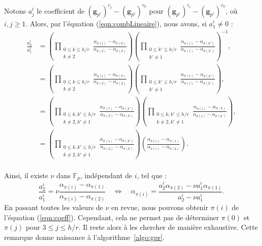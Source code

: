\documentclass[a4paper, titlepage, 11pt]{article}
\theoremstyle{definition}
\theoremstyle{remark}
\def\gf #1{\mathbb{F}_{#1}}
\def\mbf #1{\mathbf{#1}}
\begin{document}
Notons $a_j^i$ le coefficient de $(\mbf g_{p^r})^{c_{{j}}} - (\mbf g_{p^r})^{c_{0}}$ pour $(\mbf g_{p^r})^{c_{i}} - (\mbf g_{p^r})^{c_{0}}$, où $i , j\geqslant 1$. Alors, par l'équation (\ref{eqn:combLineaire}), nous avons, si $a_1^i \neq 0$ :
\begin{align*}
\frac{a_2^i}{a_1^i} &= \left(\prod_{\substack{0\leqslant k\leqslant h/r \\ k \neq 2}} \frac{\alpha_{\sigma(i)}-\alpha_{\sigma(k)}}{\alpha_{\sigma(2)}-\alpha_{\sigma(k)}} \right)\left(\prod_{\substack{0\leqslant k'\leqslant h/r \\ k' \neq 1}} \frac{\alpha_{\sigma(i)}-\alpha_{\sigma({k'})}}{\alpha_{\sigma(1)}-\alpha_{\sigma({k'})}} \right)^{-1}, \\
&= \left(\prod_{\substack{0\leqslant k\leqslant h/r \\ k \neq 2}} \frac{\alpha_{\sigma(i)}-\alpha_{\sigma(k)}}{\alpha_{\sigma(2)}-\alpha_{\sigma(k)}} \right)\left(\prod_{\substack{0\leqslant k' \leqslant h/r \\ k' \neq 1}} \frac{\alpha_{\sigma(1)}-\alpha_{\sigma({k'})}}{\alpha_{\sigma(i)}-\alpha_{\sigma({k'})}} \right), \\
&= \left(\prod_{\substack{0\leqslant k, k'\leqslant h/r \\ k \neq 2, k' \neq 1}} \frac{\alpha_{\sigma(1)}-\alpha_{\sigma({k'})}}{\alpha_{\sigma(2)}-\alpha_{\sigma(k)}} \right) \left(\prod_{\substack{0\leqslant k, k'\leqslant h/r \\ k \neq 2, k' \neq 1}} \frac{\alpha_{\sigma(i)}-\alpha_{\sigma(k)}}{\alpha_{\sigma(i)}-\alpha_{\sigma({k'})}} \right), \\
&= \left(\prod_{\substack{0\leqslant k, k'\leqslant h/r \\ k \neq 2, k' \neq 1}} \frac{\alpha_{\sigma(1)}-\alpha_{\sigma({k'})}}{\alpha_{\sigma(2)}-\alpha_{\sigma(k)}} \right) \left(\frac{\alpha_{\sigma(i)}-\alpha_{\sigma(1)}}{\alpha_{\sigma(i)}-\alpha_{\sigma(2)}} \right). \\
\end{align*}

Ainsi, il existe $\nu$ dans $\gf{p}$, indépendant de $i$, tel que :
\begin{equation}\label{eqn:coeff}
\frac{a_2^i}{a_1^i} = \nu \frac{\alpha_{\pi(i)}-\alpha_{\pi(1)}}{\alpha_{\pi(i)}-\alpha_{\pi(2)}}\quad\Leftrightarrow\quad
\alpha_{\pi(i)} = \frac{a_2^i\alpha_{\pi(2)}-\nu a_1^i\alpha_{\pi(1)}}{a_2^i-\nu a_1^i}.
\end{equation}
En passant toutes les valeurs de $\nu$ en revue, nous pouvons obtenir $\pi(i)$ de l'équation (\ref{eqn:coeff}). Cependant, cela ne permet pas de déterminer $\pi(0)$ et $\pi(j)$ pour $3 \leqslant j \leqslant h/r$. Il reste alors à les chercher de manière exhaustive. Cette remarque donne naissance à l'algorithme~\ref{algo:gpr}.
\end{document}
